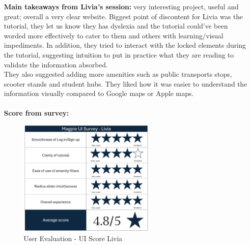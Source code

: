 \noindent\textbf{Main takeaways from Livia's session: }very interesting project, useful and great; overall a very clear website. Biggest point of discontent for Livia was the tutorial, they let us know they has dyslexia and the tutorial could've been worded more effectively to cater to them and others with learning/visual impediments. In addition, they tried to interact with the locked elements during the tutorial, suggesting intuition to put in practice what they are reading to validate the information absorbed.\\
They also suggested adding more amenities such as public transports stops, scooter stands and student hubs. They liked how it was easier to understand the information visually compared to Google maps or Apple maps.\\ \\
\textbf{Score from survey: }
\begin{figure}[h!]
    \centering
    \includegraphics[width=0.6\textwidth]{images/survey-livia.png}
    \caption{User Evaluation - UI Score Livia}
\end{figure}

\newpage

